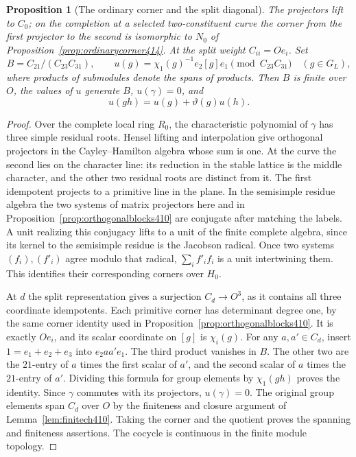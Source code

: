 \documentclass[a4paper,11pt]{article}
\newtheorem{proposition}{Proposition}[section]
\theoremstyle{definition}
\theoremstyle{remark}
\numberwithin{equation}{section}
\begin{document}
\begin{proposition}[The ordinary corner and the split diagonal]\leavevmode
\label{prop:splitcorner415}
The projectors lift to \(C_0\); on the completion at a
selected two-constituent curve the corner from the first
projector to the second is isomorphic to \(N_0\) of
Proposition~\ref{prop:ordinarycorner414}. At the split
weight \(C_{ii}=Oe_i\). Set
\[
 B=C_{21}/(C_{23}C_{31}),\qquad
 u(g)=\chi_1(g)^{-1} e_2[g]e_1\pmod{C_{23}C_{31}}
                     \quad(g\in G_L),
\]
where products of submodules denote the spans of products.
Then \(B\) is finite over \(O\), the values of \(u\) generate
\(B\), \(u(\gamma)=0\), and
\[
                 u(gh)=u(g)+\vartheta(g)u(h).
\]
\end{proposition}
\begin{proof}
Over the complete local ring \(R_0\), the characteristic
polynomial of \(\gamma\) has three simple residual roots.
Hensel lifting and interpolation give orthogonal projectors
in the Cayley--Hamilton algebra whose sum is one. At the
curve the second lies on the character line: its reduction
in the stable lattice is the middle character, and the
other two residual roots are distinct from it. The first
idempotent projects to a primitive line in the plane.
In the semisimple residue algebra the two systems of matrix
projectors here and in Proposition~\ref{prop:orthogonalblocks410}
are conjugate after matching the labels. A unit realizing
this conjugacy lifts to a unit of the finite complete
algebra, since its kernel to the semisimple residue is the
Jacobson radical. Once two systems \((f_i),(f'_i)\) agree
modulo that radical, \(\sum_i f'_i f_i\) is a unit
intertwining them. This identifies their corresponding
corners over \(H_0\).

At \(d\) the split representation gives a surjection
\(C_d\to O^3\), as it contains all three coordinate
idempotents. Each primitive corner has determinant degree
one, by the same corner identity used in
Proposition~\ref{prop:orthogonalblocks410}. It is exactly
\(Oe_i\), and its scalar coordinate on \([g]\) is
\(\chi_i(g)\). For any \(a,a'\in C_d\), insert
\(1=e_1+e_2+e_3\) into \(e_2 a a'e_1\). The third product
vanishes in \(B\). The other two are the \(21\)-entry of
\(a\) times the first scalar of \(a'\), and the second
scalar of \(a\) times the \(21\)-entry of \(a'\).
Dividing this formula for group elements by \(\chi_1(gh)\)
proves the identity. Since \(\gamma\) commutes with its
projectors, \(u(\gamma)=0\). The original group elements
span \(C_d\) over \(O\) by the finiteness and closure
argument of Lemma~\ref{lem:finitech410}. Taking the corner
and the quotient proves the spanning and finiteness assertions.
The cocycle is continuous in the finite module topology.
\end{proof}
\end{document}
